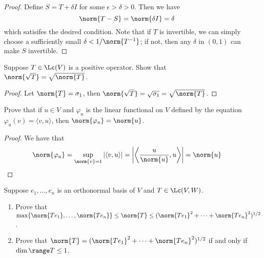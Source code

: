 \documentclass{extarticle}
\begin{document}
\begin{proof}
Define \(S = T + \delta I\) for some \(\epsilon > \delta > 0\). Then we
have
\[\norm{T - S} = \norm{\delta I} = \delta \]
which satisifes the desired condition. Note that if \(T\) is invertible, we can
simply choose a sufficiently small \(\delta < 1/\norm{T^{-1}}\); if not, then any
\(\delta\) in \((0, 1)\) can make \(S\) invertible.
\end{proof}

\begin{problem}{12}
    Suppose \(T \in \Lc(V)\) is a positive operator. Show
    that \(\norm{\sqrt{T}} = \sqrt{\norm{T}}\).
\end{problem}

\begin{proof}
Let \(\norm{T} = \sigma_1\), then \(\norm{\sqrt{T}}
= \sqrt{\sigma_1} = \sqrt{\norm{T}}\).
\end{proof}

\begin{problem}{17}
    Prove that if \(u \in V\) and \(\varphi_u\) is the linear functional on \(V\) defined
    by the equation \(\varphi_u(v) = \langle v,u \rangle\), then \(\norm{\varphi_u} = \norm{u}\).
\end{problem}

\begin{proof}
We have that
\[\norm{\varphi_u} = \sup_{\norm{v} = 1} |\langle v,u \rangle| = \left|\left\langle \frac{u}{\norm{u}},u \right\rangle \right| = \norm{u}\]
\end{proof}

\begin{problem}{18}
    Suppose \(e_1, \ldots, e_n\) is an orthonormal basis of \(V\) and \(T \in \Lc(V, W)\).
    \begin{enumerate}[label=(\alph*)]
        \item Prove that \(\max\{\norm{Te_1}, \ldots, \norm{Te_n}\}\leq \norm{T} \leq (\norm{Te_1}^2 + \cdots + \norm{Te_n}^2)^{1/2}\).
        \item Prove that \(\norm{T} = (\norm{T e_1}^2 + \cdots + \norm{Te_n}^2)^{1/2}\) if and only
        if \(\dim \range T \leq 1\).
    \end{enumerate}
\end{problem}
\end{document}
